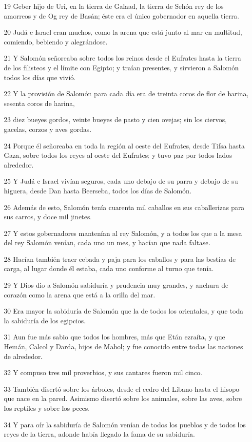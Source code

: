 \par 19 Geber hijo de Uri, en la tierra de Galaad, la tierra de Sehón rey de los amorreos y de Og rey de Basán; éste era el único gobernador en aquella tierra.
\par 20 Judá e Israel eran muchos, como la arena que está junto al mar en multitud, comiendo, bebiendo y alegrándose.
\par 21 Y Salomón señoreaba sobre todos los reinos desde el Eufrates hasta la tierra de los filisteos y el límite con Egipto; y traían presentes, y sirvieron a Salomón todos los días que vivió.
\par 22 Y la provisión de Salomón para cada día era de treinta coros   de flor de harina, sesenta coros de harina,
\par 23 diez bueyes gordos, veinte bueyes de pasto y cien ovejas; sin los ciervos, gacelas, corzos y aves gordas.
\par 24 Porque él señoreaba en toda la región al oeste del Eufrates, desde Tifsa hasta Gaza, sobre todos los reyes al oeste del Eufrates; y tuvo paz por todos lados alrededor.
\par 25 Y Judá e Israel vivían seguros, cada uno debajo de su parra y debajo de su higuera, desde Dan hasta Beerseba, todos los días de Salomón.
\par 26 Además de esto, Salomón tenía cuarenta mil caballos en sus caballerizas para sus carros, y doce mil jinetes. 
\par 27 Y estos gobernadores mantenían al rey Salomón, y a todos los que a la mesa del rey Salomón venían, cada uno un mes, y hacían que nada faltase.
\par 28 Hacían también traer cebada y paja para los caballos y para las bestias de carga, al lugar donde él estaba, cada uno conforme al turno que tenía.
\par 29 Y Dios dio a Salomón sabiduría y prudencia muy grandes, y anchura de corazón como la arena que está a la orilla del mar.
\par 30 Era mayor la sabiduría de Salomón que la de todos los orientales, y que toda la sabiduría de los egipcios.
\par 31 Aun fue más sabio que todos los hombres, más que Etán ezraíta, y que Hemán, Calcol y Darda, hijos de Mahol; y fue conocido entre todas las naciones de alrededor.
\par 32 Y compuso tres mil proverbios, y sus cantares fueron mil cinco. 
\par 33 También disertó sobre los árboles, desde el cedro del Líbano hasta el hisopo que nace en la pared. Asimismo disertó sobre los animales, sobre las aves, sobre los reptiles y sobre los peces.
\par 34 Y para oír la sabiduría de Salomón venían de todos los pueblos y de todos los reyes de la tierra, adonde había llegado la fama de su sabiduría.

